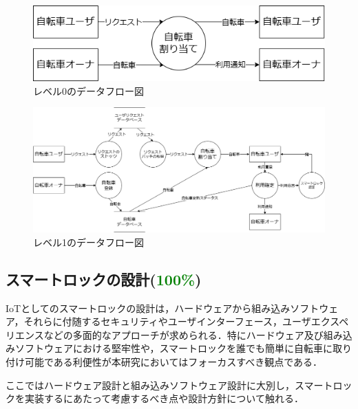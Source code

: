           \begin{figure}[htbp]
            \centering
            \includegraphics[scale=0.4]
            {figures/dfd-level0.drawio.png}
            \caption{レベル0のデータフロー図}
            \label{fig:レベル0のデータフロー図}
          \end{figure}

          \begin{figure}[htbp]
            \centering
            \includegraphics[scale=0.4]
            {figures/dfd-level1.drawio.png}
            \caption{レベル1のデータフロー図}
            \label{fig:レベル1のデータフロー図}
          \end{figure}

  \subsection{スマートロックの設計(\textcolor{green}{100\%})}
    \label{sec:スマートロックの設計}
      \par IoTとしてのスマートロックの設計は，ハードウェアから組み込みソフトウェア，それらに付随するセキュリティやユーザインターフェース，ユーザエクスペリエンスなどの多面的なアプローチが求められる．特にハードウェア及び組み込みソフトウェアにおける堅牢性や，スマートロックを誰でも簡単に自転車に取り付け可能である利便性が本研究においてはフォーカスすべき観点である．
      \par ここではハードウェア設計と組み込みソフトウェア設計に大別し，スマートロックを実装するにあたって考慮するべき点や設計方針について触れる．
      
